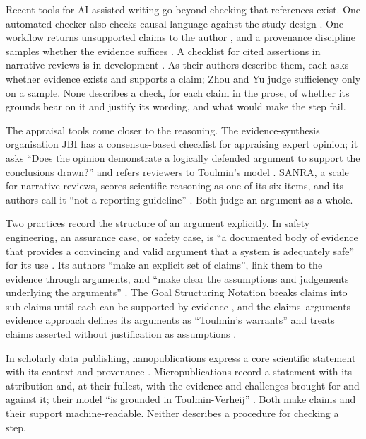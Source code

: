 \documentclass[12pt, a4paper]{article}
\begin{document}
Recent tools for AI-assisted writing go beyond checking that references
exist.  One automated checker also checks causal language against the study design
\citep{samsonau2026}.  One workflow returns unsupported claims to the
author \citep{chen2026}, and a provenance discipline samples whether the
evidence suffices \citep{zhou2026}.  A checklist for cited assertions in
narrative reviews is in development \citep{vanra2026}.  As their authors describe them, each asks whether
evidence exists and supports a claim; Zhou and Yu judge sufficiency only
on a sample.  None describes a check, for
each claim in the prose, of whether its grounds bear on it and justify
its wording, and what would make the step fail.

The appraisal tools come closer to the reasoning.  The evidence-synthesis
organisation JBI has a consensus-based checklist for appraising expert
opinion; it asks ``Does the opinion
demonstrate a logically defended argument to support the conclusions
drawn?'' and refers reviewers to Toulmin's model
\citep{mcarthur2025,jbi2026}.  SANRA, a scale for narrative reviews,
scores scientific reasoning as one of its six items, and its authors
call it ``not a reporting guideline'' \citep{baethge2019}.  Both judge an argument as a whole.

Two practices record the structure of an argument explicitly.  In safety engineering, an assurance case, or safety case, is ``a
documented body of evidence that provides a convincing and valid
argument that a system is adequately safe'' for its use
\citep{bishop1998}.  Its authors ``make an explicit
set of claims'', link them to the evidence through arguments, and ``make
clear the assumptions and judgements underlying the arguments''
\citep{bishop1998}.  The Goal Structuring Notation breaks claims into
sub-claims until each can be supported by evidence \citep{kelly2004},
and the claims--arguments--evidence approach defines its arguments as
``Toulmin's warrants'' and treats claims asserted without justification
as assumptions \citep{bloomfield2014}.

In scholarly data publishing, nanopublications express a core
scientific statement with its context and provenance \citep{groth2010}.  Micropublications record a statement with its
attribution and, at their fullest, with the evidence and challenges
brought for and against it; their model ``is grounded in
Toulmin-Verheij'' \citep{clark2014}.  Both make claims and their support
machine-readable.  Neither describes a procedure for checking a step.
\end{document}
